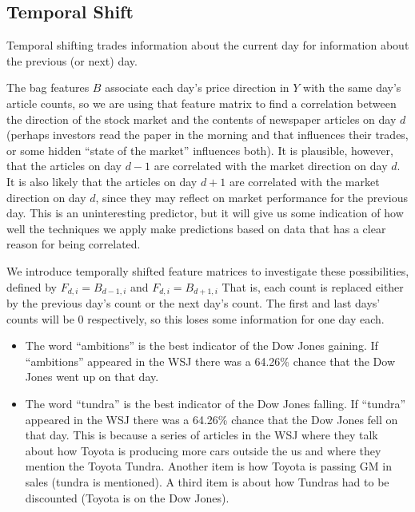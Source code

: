 \documentclass[10pt]{article}
\begin{document}
\subsection{Temporal Shift}


Temporal shifting trades information about the current day for information about the previous (or next) day.


The bag features $B$ associate each day's price direction in $Y$ with the same day's article counts, so we are using that feature matrix to find a correlation between the direction of the stock market and the contents of newspaper articles on day $d$ (perhaps investors read the paper in the morning and that influences their trades, or some hidden ``state of the market'' influences both). It is plausible, however, that the articles on day $d-1$ are correlated with the market direction on day $d$. It is also likely that the articles on day $d+1$ are correlated with the market direction on day $d$, since they may reflect on market performance for the previous day. This is an uninteresting predictor, but it will give us some indication of how well the techniques we apply make predictions based on data that has a clear reason for being correlated.

We introduce temporally shifted feature matrices to investigate these possibilities, defined by $F_{d,i} = B_{d-1,i}$ and $F_{d,i} = B_{d+1,i}$ That is, each count is replaced either by the previous day's count or the next day's count. The first and last days' counts will be 0 respectively, so this loses some information for one day each.

\begin{itemize}
\item The word ``ambitions'' is the best indicator of the Dow Jones gaining. If ``ambitions'' appeared in the WSJ there was a 64.26\% chance that the Dow Jones went up on that day.
\item The word ``tundra'' is the best indicator of the Dow Jones falling. If ``tundra'' appeared in the WSJ there was a 64.26\% chance that the Dow Jones fell on that day. This is because a series of articles in the WSJ where they talk about how Toyota is producing more cars outside the us and where they mention the Toyota Tundra. Another item is how Toyota is passing GM in sales (tundra is mentioned). A third item is about how Tundras had to be discounted (Toyota is on the Dow Jones).

\end{itemize}



\end{document}
